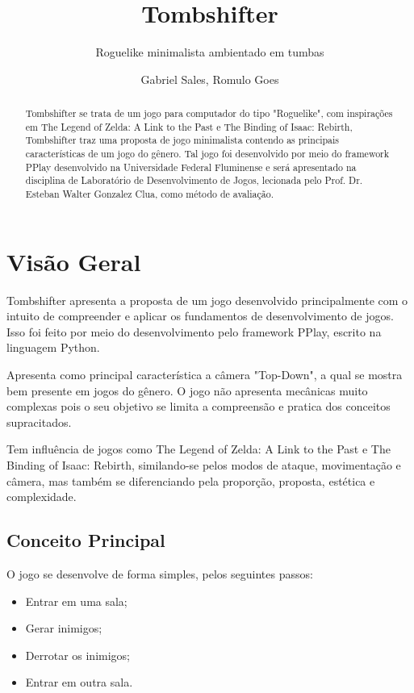 \documentclass[a4paper]{scrreprt}
\title{Tombshifter}
\subtitle{Roguelike minimalista ambientado em tumbas}
\author{Gabriel Sales, Romulo Goes}
\begin{document}
\maketitle

\newpage

\begin{abstract}
Tombshifter se trata de um jogo para computador do tipo "Roguelike", com inspirações em The Legend of Zelda: A Link to the Past e The Binding of Isaac: Rebirth, Tombshifter traz uma proposta de jogo minimalista contendo as principais características de um jogo do gênero. Tal jogo foi desenvolvido por meio do framework PPlay desenvolvido na Universidade Federal Fluminense e será apresentado na disciplina de Laboratório de Desenvolvimento de Jogos, lecionada pelo Prof. Dr. Esteban Walter Gonzalez Clua, como método de avaliação. 
\end{abstract}

\tableofcontents

\chapter{Visão Geral}
    Tombshifter apresenta a proposta de um jogo desenvolvido principalmente com o intuito de compreender e aplicar os fundamentos de desenvolvimento de jogos. Isso foi feito por meio do desenvolvimento pelo framework PPlay, escrito na linguagem Python.

    Apresenta como principal característica a câmera "Top-Down", a qual se mostra bem presente em jogos do gênero. O jogo não apresenta mecânicas muito complexas pois o seu objetivo se limita a compreensão e pratica dos conceitos supracitados.

    Tem influência de jogos como The Legend of Zelda: A Link to the Past e The Binding of Isaac: Rebirth, similando-se pelos modos de ataque, movimentação e câmera, mas também se diferenciando pela proporção, proposta, estética e complexidade.


\section{Conceito Principal}
    O jogo se desenvolve de forma simples, pelos seguintes passos:
    \begin{itemize}
        \item Entrar em uma sala;
        \item Gerar inimigos;
        \item Derrotar os inimigos;
        \item Entrar em outra sala.
    \end{itemize}
\end{document}
